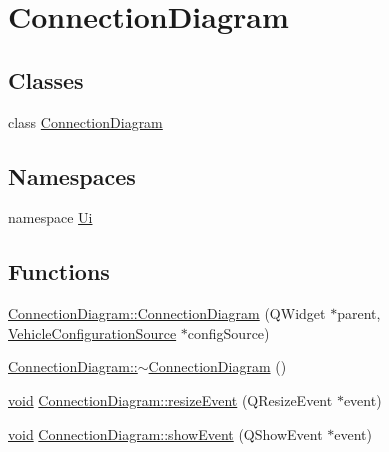 \hypertarget{group___connection_diagram}{\section{\-Connection\-Diagram}
\label{group___connection_diagram}
}
\subsection*{\-Classes}
\begin{DoxyCompactItemize}
\item 
class \hyperlink{class_connection_diagram}{\-Connection\-Diagram}
\end{DoxyCompactItemize}
\subsection*{\-Namespaces}
\begin{DoxyCompactItemize}
\item 
namespace \hyperlink{namespace_ui}{\-Ui}
\end{DoxyCompactItemize}
\subsection*{\-Functions}
\begin{DoxyCompactItemize}
\item 
\hyperlink{group___connection_diagram_gac4980bbc0b4895238c2f6184739b88b9}{\-Connection\-Diagram\-::\-Connection\-Diagram} (\-Q\-Widget $\ast$parent, \hyperlink{class_vehicle_configuration_source}{\-Vehicle\-Configuration\-Source} $\ast$config\-Source)
\item 
\hyperlink{group___connection_diagram_gab640bd026ce6a3692e7f4cd1d7d0f907}{\-Connection\-Diagram\-::$\sim$\-Connection\-Diagram} ()
\item 
\hyperlink{group___u_a_v_objects_plugin_ga444cf2ff3f0ecbe028adce838d373f5c}{void} \hyperlink{group___connection_diagram_ga286bacde8e23a0b374d72fb979203bb8}{\-Connection\-Diagram\-::resize\-Event} (\-Q\-Resize\-Event $\ast$event)
\item 
\hyperlink{group___u_a_v_objects_plugin_ga444cf2ff3f0ecbe028adce838d373f5c}{void} \hyperlink{group___connection_diagram_ga53179afe974da356b81da1fea3ee75b8}{\-Connection\-Diagram\-::show\-Event} (\-Q\-Show\-Event $\ast$event)
\end{DoxyCompactItemize}


